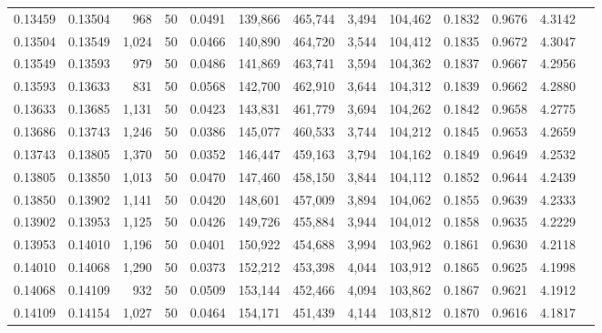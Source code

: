 \begin{tabular}{rrrrrrrrrrrrr}
0.13459 & 0.13504 &   968 &  50 &                                     0.0491 & 139,866 & 465,744 &   3,494 & 104,462 & 0.1832 & 0.9676 & 4.3142 \\
0.13504 & 0.13549 & 1,024 &  50 &                                     0.0466 & 140,890 & 464,720 &   3,544 & 104,412 & 0.1835 & 0.9672 & 4.3047 \\
0.13549 & 0.13593 &   979 &  50 &                                     0.0486 & 141,869 & 463,741 &   3,594 & 104,362 & 0.1837 & 0.9667 & 4.2956 \\
0.13593 & 0.13633 &   831 &  50 &                                     0.0568 & 142,700 & 462,910 &   3,644 & 104,312 & 0.1839 & 0.9662 & 4.2880 \\
0.13633 & 0.13685 & 1,131 &  50 &                                     0.0423 & 143,831 & 461,779 &   3,694 & 104,262 & 0.1842 & 0.9658 & 4.2775 \\
0.13686 & 0.13743 & 1,246 &  50 &                                     0.0386 & 145,077 & 460,533 &   3,744 & 104,212 & 0.1845 & 0.9653 & 4.2659 \\
0.13743 & 0.13805 & 1,370 &  50 &                                     0.0352 & 146,447 & 459,163 &   3,794 & 104,162 & 0.1849 & 0.9649 & 4.2532 \\
0.13805 & 0.13850 & 1,013 &  50 &                                     0.0470 & 147,460 & 458,150 &   3,844 & 104,112 & 0.1852 & 0.9644 & 4.2439 \\
0.13850 & 0.13902 & 1,141 &  50 &                                     0.0420 & 148,601 & 457,009 &   3,894 & 104,062 & 0.1855 & 0.9639 & 4.2333 \\
0.13902 & 0.13953 & 1,125 &  50 &                                     0.0426 & 149,726 & 455,884 &   3,944 & 104,012 & 0.1858 & 0.9635 & 4.2229 \\
0.13953 & 0.14010 & 1,196 &  50 &                                     0.0401 & 150,922 & 454,688 &   3,994 & 103,962 & 0.1861 & 0.9630 & 4.2118 \\
0.14010 & 0.14068 & 1,290 &  50 &                                     0.0373 & 152,212 & 453,398 &   4,044 & 103,912 & 0.1865 & 0.9625 & 4.1998 \\
0.14068 & 0.14109 &   932 &  50 &                                     0.0509 & 153,144 & 452,466 &   4,094 & 103,862 & 0.1867 & 0.9621 & 4.1912 \\
0.14109 & 0.14154 & 1,027 &  50 &                                     0.0464 & 154,171 & 451,439 &   4,144 & 103,812 & 0.1870 & 0.9616 & 4.1817 \\

\end{tabular}
